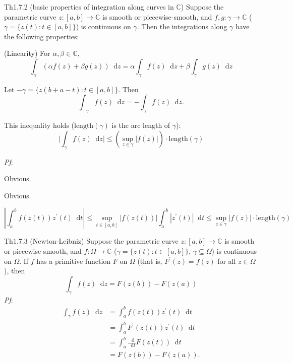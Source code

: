 \documentclass{article}
\newcommand{\dif}{\mathop{}\!\mathrm{d}}
\begin{document}
\begin{Th}{Th1.7.2 (basic properties of integration along curves in $\mathbb{C}$)}
    Suppose the parametric curve $z: [a,b]\to\mathbb{C}$ is smooth or piecewise-smooth, and $f, g:\gamma\to\mathbb{C}$ ($\gamma = \{z(t): t\in [a,b]\}$) is continuous on $\gamma$. Then the integrations along $\gamma$ have the following properties:
    \begin{compactenum}
        \item (Linearity) For $\alpha,\beta\in\mathbb{C}$,
        $$ \int_\gamma \left(\alpha f(z) +\beta g(z)\right) \dif z = \alpha\int_\gamma f(z)\dif z + \beta\int_\gamma g(z)\dif z $$
        \item \textcolor{Df}{Let $-\gamma = \{z(b+a-t): t\in [a,b]\}$. } Then 
        $$ \int_{-\gamma} f(z)\dif z = -\int_\gamma f(z)\dif z. $$
        \item This inequality holds ($\text{length}(\gamma)$ is the arc length of $\gamma$):
        $$ \Bigg| \int_\gamma f(z)\dif z \Bigg| \leq \left(\sup_{z\in\gamma} |f(z)|\right) \cdot \text{length}(\gamma) $$
    \end{compactenum}
    \tcblower
    \textit{Pf}: 
    \begin{compactenum}
        \item Obvious.
        \item Obvious.
        \item $$ \left|\int_a^b f(z(t))z^\prime (t)\dif t\right|\leq\sup_{t\in[a,b]}|f(z(t))|\int_a^b|z^{\prime}(t)|\dif t\leq\sup_{z\in\gamma}|f(z)|\cdot\mathrm{length}(\gamma) $$
    \end{compactenum}
\end{Th}

\begin{Th}{Th1.7.3 (Newton-Leibniz)}
    Suppose the parametric curve $z: [a,b]\to\mathbb{C}$ is smooth or piecewise-smooth, and $f:\varOmega\to\mathbb{C}$ ($\gamma = \{z(t): t\in [a,b]\}$, $\gamma\subseteq\varOmega$) is continuous on $\varOmega$. If $f$ has a primitive function $F$ on $\varOmega$ \textcolor{Df}{(that is, $F^\prime (z) = f(z)$ for all $z\in\varOmega$)}, then
    $$ \int_\gamma f(z)\dif z = F(z(b)) - F(z(a)) $$
    \tcblower
    \textit{Pf}: 
    $$
    \begin{aligned}
        \int_{\gamma}f(z)\dif z & =\int_a^bf(z(t))z^{\prime}(t)\dif t \\
         & =\int_a^b F^{\prime}(z(t))z^{\prime}(t) \dif t \\
         & =\int_a^b\frac{\dif}{\dif t}F(z(t))\dif t \\
         & =F(z(b))-F(z(a)).
    \end{aligned}
    $$
\end{Th}
\end{document}
